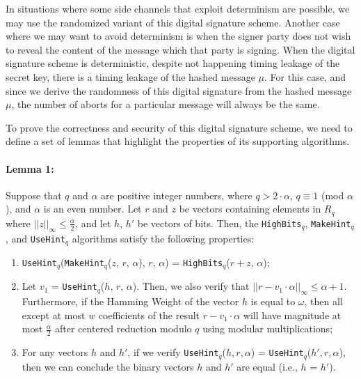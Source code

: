 \documentclass[runningheads]{llncs}
\numberwithin{equation}{section}
\begin{document}
    In situations where some side channels that exploit determinism are possible, we may use the randomized variant of this digital signature scheme. Another case where we may want to avoid determinism is when the signer party does not wish to reveal the content of the message which that party is signing. When the digital signature scheme is deterministic, despite not happening timing leakage of the secret key, there is a timing leakage of the hashed message $\mu$. For this case, and since we derive the randomness of this digital signature from the hashed message $\mu$, the number of aborts for a particular message will always be the same.

    \noindent To prove the correctness and security of this digital signature scheme, we need to define a set of lemmas that highlight the properties of its supporting algorithms.

    \paragraph{\textbf{Lemma 1:}} Suppose that $q$ and $\alpha$ are positive integer numbers, where $q > 2 \cdot \alpha$, $q \equiv 1$ (mod $\alpha$), and $\alpha$ is an even number. Let $r$ and $z$ be vectors containing elements in ${R}_{q}$ where ${||z||}_{\infty} \leq \frac{\alpha}{2}$, and let $h$, $h'$ be vectors of bits. Then, the \texttt{HighBits}${}_{q}$, \texttt{MakeHint}${}_{q}$, and \texttt{UseHint}${}_{q}$ algorithms satisfy the following properties: 
    \begin{enumerate}
        \item \texttt{UseHint}${}_{q}$(\texttt{MakeHint}${}_{q}$($z$, $r$, $\alpha$), $r$, $\alpha$) = \texttt{HighBits}${}_{q}$($r + z$, $\alpha$);
        \item Let ${v}_{1}$ = \texttt{UseHint}${}_{q}$($h$, $r$, $\alpha$). Then, we also verify that ${||r - {v}_{1} \cdot \alpha||}_{\infty} \leq \alpha + 1$. Furthermore, if the Hamming Weight of the vector $h$ is equal to $\omega$, then all except at most $w$ coefficients of the result $r - {v}_{1} \cdot \alpha$ will have magnitude at most $\frac{\alpha}{2}$ after centered reduction modulo $q$ using modular multiplications;
        \item For any vectors $h$ and $h'$, if we verify \texttt{UseHint}${}_{q}$($h, r, \alpha$) = \texttt{UseHint}${}_{q}$($h', r, \alpha$), then we can conclude the binary vectors $h$ and $h'$ are equal (i.e., $h$ = $h'$).
    \end{enumerate}
\end{document}
